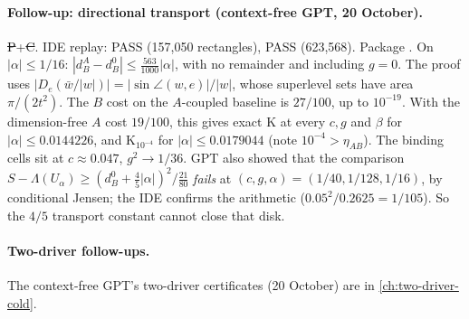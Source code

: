 \paragraph{Follow-up: directional transport (context-free GPT, 20 October).} \st{P}+\st{C}. IDE replay:  PASS (157{,}050 rectangles),  PASS (623{,}568).
Package . On $|\alpha|\le1/16$: $|d_B^A-d_B^0|\le\frac{563}{1000}|\alpha|$, with no remainder and including $g=0$.
The proof uses $|D_e(\bar w/|w|)|=|\sin\angle(w,e)|/|w|$, whose superlevel sets have area $\pi/(2t^2)$. The $B$ cost on the $A$-coupled baseline is $27/100$, up to $10^{-19}$. With the
dimension-free $A$ cost $19/100$, this gives exact K at every $c,g$ and $\beta$ for $|\alpha|\le0.0144226$, and K$_{10^{-4}}$ for $|\alpha|\le0.0179044$ (note $10^{-4}>\eta_{AB}$). The binding cells
sit at $c\approx0.047$, $g^2\to1/36$. GPT also showed that the comparison $S-\Lambda(U_\alpha)\ge(d_B^0+\frac45|\alpha|)^2/\frac{21}{80}$ \emph{fails} at $(c,g,\alpha)=(1/40,1/128,1/16)$, by
conditional Jensen; the IDE confirms the arithmetic ($0.05^2/0.2625=1/105$). So the $4/5$ transport constant cannot close that disk.

\paragraph{Two-driver follow-ups.} The context-free GPT's two-driver certificates (20 October) are in \autoref{ch:two-driver-cold}.
